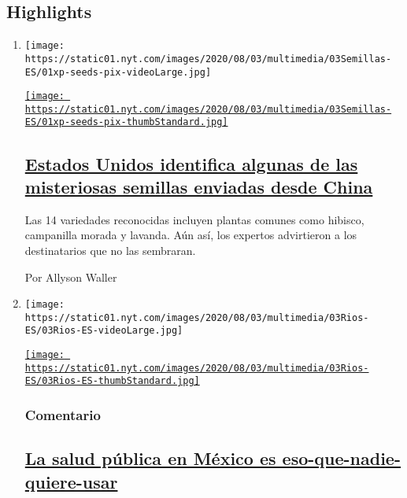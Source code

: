 \hypertarget{highlights}{%
\subsection{Highlights}\label{highlights}}

\begin{enumerate}
\def\labelenumi{\arabic{enumi}.}
\item
  \texttt{[image: https://static01.nyt.com/images/2020/08/03/multimedia/03Semillas-ES/01xp-seeds-pix-videoLarge.jpg]}

  \href{/es/2020/08/03/espanol/estados-unidos/semillas-correo-china.html}{\texttt{[image: https://static01.nyt.com/images/2020/08/03/multimedia/03Semillas-ES/01xp-seeds-pix-thumbStandard.jpg]}}

  \hypertarget{estados-unidos-identifica-algunas-de-las-misteriosas-semillas-enviadas-desde-china}{%
  \subsection{\texorpdfstring{\href{/es/2020/08/03/espanol/estados-unidos/semillas-correo-china.html}{Estados
  Unidos identifica algunas de las misteriosas semillas enviadas desde
  China}}{Estados Unidos identifica algunas de las misteriosas semillas enviadas desde China}}\label{estados-unidos-identifica-algunas-de-las-misteriosas-semillas-enviadas-desde-china}}

  Las 14 variedades reconocidas incluyen plantas comunes como hibisco,
  campanilla morada y lavanda. Aún así, los expertos advirtieron a los
  destinatarios que no las sembraran.

  Por Allyson Waller
\item
  \texttt{[image: https://static01.nyt.com/images/2020/08/03/multimedia/03Rios-ES/03Rios-ES-videoLarge.jpg]}

  \href{/es/2020/08/03/espanol/opinion/servicio-salud-mexico.html}{\texttt{[image: https://static01.nyt.com/images/2020/08/03/multimedia/03Rios-ES/03Rios-ES-thumbStandard.jpg]}}

  \hypertarget{comentario}{%
  \subsubsection{Comentario}\label{comentario}}

  \hypertarget{la-salud-puxfablica-en-muxe9xico-es-eso-que-nadie-quiere-usar}{%
  \subsection{\texorpdfstring{\href{/es/2020/08/03/espanol/opinion/servicio-salud-mexico.html}{La
  salud pública en México es
  eso-que-nadie-quiere-usar}}{La salud pública en México es eso-que-nadie-quiere-usar}}\label{la-salud-puxfablica-en-muxe9xico-es-eso-que-nadie-quiere-usar}}


\end{enumerate}
